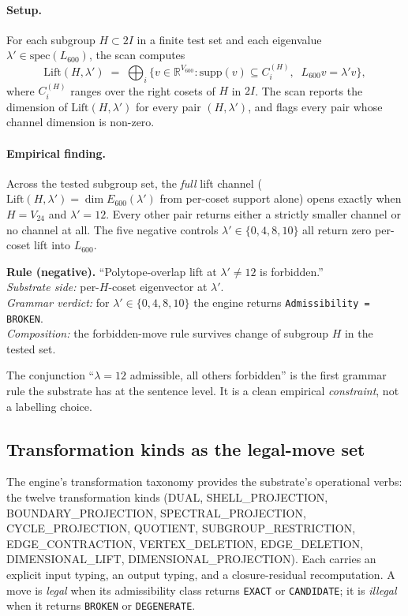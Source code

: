 \documentclass[11pt,a4paper]{article}
\newcommand{\Vtf}{V_{24}}
\newcommand{\R}{\mathbb{R}}
\newcommand{\Esix}{E_{600}}
\begin{document}
\paragraph{Setup.} For each subgroup $H \subset 2I$ in a finite
test set and each eigenvalue $\lambda' \in \mathrm{spec}(L_{600})$,
the scan computes
\[
\mathrm{Lift}(H, \lambda') \;=\; \bigoplus_i \big\{ v \in \R^{V_{600}} :
 \mathrm{supp}(v) \subseteq C_i^{(H)},\;\; L_{600} v = \lambda' v \big\},
\]
where $C_i^{(H)}$ ranges over the right cosets of $H$ in $2I$. The
scan reports the dimension of $\mathrm{Lift}(H, \lambda')$ for every
pair $(H, \lambda')$, and flags every pair whose channel dimension
is non-zero.

\paragraph{Empirical finding.} Across the tested subgroup set, the
\emph{full} lift channel
($\mathrm{Lift}(H, \lambda') = \dim \Esix(\lambda')$ from per-coset
support alone) opens exactly when $H = \Vtf$ and $\lambda' = 12$.
Every other pair returns either a strictly smaller channel or no
channel at all. The five negative controls
$\lambda' \in \{0, 4, 8, 10\}$ all return zero per-coset lift into
$L_{600}$.

\begin{grammarbox}
\textbf{Rule (negative).} ``Polytope-overlap lift at
$\lambda' \ne 12$ is forbidden.''
\\
\emph{Substrate side:} per-$H$-coset eigenvector at $\lambda'$.
\\
\emph{Grammar verdict:} for $\lambda' \in \{0, 4, 8, 10\}$ the
engine returns \texttt{Admissibility = BROKEN}.
\\
\emph{Composition:} the forbidden-move rule survives change of
subgroup $H$ in the tested set.
\end{grammarbox}

The conjunction ``$\lambda = 12$ admissible, all others
forbidden'' is the first grammar rule the substrate has at the
sentence level. It is a clean empirical \emph{constraint}, not a
labelling choice.

\subsection{Transformation kinds as the legal-move set}
\label{sec:grammar:moves}

The engine's transformation taxonomy provides the substrate's
operational verbs: the twelve transformation kinds (DUAL,
SHELL\_PROJECTION, BOUNDARY\_PROJECTION, SPECTRAL\_PROJECTION,
CYCLE\_PROJECTION, QUOTIENT, SUBGROUP\_RESTRICTION,
EDGE\_CONTRACTION, VERTEX\_DELETION, EDGE\_DELETION,
DIMENSIONAL\_LIFT, DIMENSIONAL\_PROJECTION). Each carries an
explicit input typing, an output typing, and a closure-residual
recomputation. A move is \emph{legal} when its admissibility class
returns \texttt{EXACT} or \texttt{CANDIDATE}; it is \emph{illegal}
when it returns \texttt{BROKEN} or \texttt{DEGENERATE}.
\end{document}
